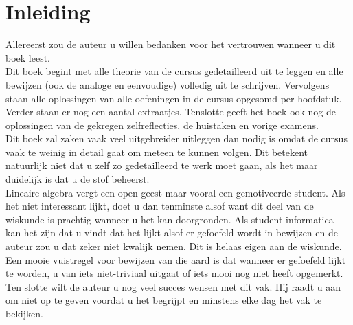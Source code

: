 \documentclass[lineaire_algebra_oplossingen.tex]{subfiles}
\begin{document}
\newpage
\section*{Inleiding}

\noindent Allereerst zou de auteur u willen bedanken voor het vertrouwen wanneer u dit boek leest.\\

\noindent Dit boek begint met alle theorie van de cursus gedetailleerd uit te leggen en alle bewijzen (ook de analoge en eenvoudige) volledig uit te schrijven. Vervolgens staan alle oplossingen van alle oefeningen in de cursus opgesomd per hoofdstuk. Verder staan er nog een aantal extraatjes. Tenslotte geeft het boek ook nog de oplossingen van de gekregen zelfreflecties, de huistaken en vorige examens.\\

\noindent Dit boek zal zaken vaak veel uitgebreider uitleggen dan nodig is omdat de cursus vaak te weinig in detail gaat om meteen te kunnen volgen. Dit betekent natuurlijk niet dat u zelf zo gedetailleerd te werk moet gaan, als het maar duidelijk is dat u de stof beheerst.\\

\noindent Lineaire algebra vergt een open geest maar vooral een gemotiveerde student.
Als het niet interessant lijkt, doet u dan tenminste alsof want dit deel van de wiskunde is prachtig wanneer u het kan doorgronden.
Als student informatica kan het zijn dat u vindt dat het lijkt alsof er gefoefeld wordt in bewijzen en de auteur zou u dat zeker niet kwalijk nemen. Dit is helaas eigen aan de wiskunde.
Een mooie vuistregel voor bewijzen van die aard is dat wanneer er gefoefeld lijkt te worden, u van iets niet-triviaal uitgaat of iets mooi nog niet heeft opgemerkt.\\

\noindent Ten slotte wilt de auteur u nog veel succes wensen met dit vak. Hij raadt u aan om niet op te geven voordat u het begrijpt en minstens elke dag het vak te bekijken.
\end{document}

